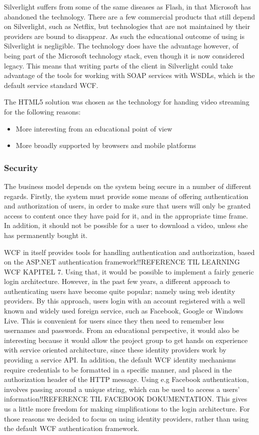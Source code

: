Silverlight suffers from some of the same diseases as Flash, in that Microsoft has abandoned the technology. There are a few commercial products that still depend on Silverlight, such as Netflix, but technologies that are not maintained by their providers are bound to disappear. As such the educational outcome of using is Silverlight is negligible. The technology does have the advantage however, of being part of the Microsoft technology stack, even though it is now considered legacy. This means that writing parts of the client in Silverlight could take advantage of the tools for working with SOAP services with WSDLs, which is the default service standard WCF.

The HTML5 solution was chosen as the technology for handing video streaming for the following reasons:
\begin{itemize}
\item More interesting from an educational point of view
\item More broadly supported by browsers and mobile platforms
\end{itemize}

\subsubsection{Security} \label{Security}
The business model depends on the system being secure in a number of different regards. Firstly, the system must provide some means of offering authentication and authorization of users, in order to make sure that users will only be granted access to content once they have paid for it, and in the appropriate time frame. In addition, it should not be possible for a user to download a video, unless she has permanently bought it.

WCF in itself provides tools for handling authentication and authorization, based on the ASP.NET authentication framework!!REFERENCE TIL LEARNING WCF KAPITEL 7. Using that, it would be possible to implement a fairly generic login architecture. However, in the past few years, a different approach to authenticating users have become quite popular; namely using web identity providers. By this approach, users login with an account registered with a well known and widely used foreign service, such as Facebook, Google or Windows Live. This is convenient for users since they then need to remember less usernames and passwords. From an educational perspective, it would also be interesting because it would allow the project group to get hands on experience with service oriented architecture, since these identity providers work by providing a service API. In addition, the default WCF identity mechanisms require credentials to be formatted in a specific manner, and placed in the authorization header of the HTTP message. Using e.g Facebook authentication, involves passing around a unique string, which can be used to access a users' information!!REFERENCE TIL FACEBOOK DOKUMENTATION. This gives us a little more freedom for making simplifications to the login architecture. For those reasons we decided to focus on using identity providers, rather than using the default WCF authentication framework.


